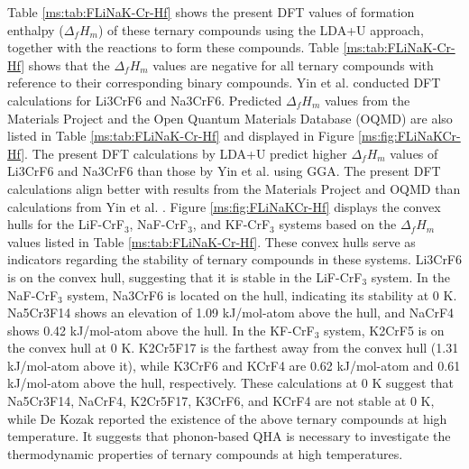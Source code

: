 Table \ref{ms:tab:FLiNaK-Cr-Hf} shows the present DFT values of formation enthalpy ($\Delta_fH_m$) of these ternary compounds using the LDA+U approach, together with the reactions to form these compounds. Table \ref{ms:tab:FLiNaK-Cr-Hf} shows that the $\Delta_fH_m$ values are negative for all ternary compounds with reference to their corresponding binary compounds. Yin et al. \cite{yin2018thermodynamic, yin2014thermodynamic} conducted DFT calculations for Li3CrF6 and Na3CrF6. Predicted $\Delta_fH_m$ values from the Materials Project \cite{jain2013commentary} and the Open Quantum Materials Database (OQMD) \cite{kirklin2015open} are also listed in Table \ref{ms:tab:FLiNaK-Cr-Hf} and displayed in Figure \ref{ms:fig:FLiNaKCr-Hf}. The present DFT calculations by LDA+U predict higher $\Delta_fH_m$ values of Li3CrF6 and Na3CrF6 than those by Yin et al. \cite{yin2018thermodynamic, yin2014thermodynamic} using GGA. The present DFT calculations align better with results from the Materials Project \cite{jain2013commentary} and OQMD \cite{kirklin2015open} than calculations from Yin et al. \cite{yin2018thermodynamic, yin2014thermodynamic}. Figure \ref{ms:fig:FLiNaKCr-Hf} displays the convex hulls for the LiF-CrF$_3$, NaF-CrF$_3$, and KF-CrF$_3$ systems based on the $\Delta_fH_m$ values listed in Table \ref{ms:tab:FLiNaK-Cr-Hf}. These convex hulls serve as indicators regarding the stability of ternary compounds in these systems. Li3CrF6 is on the convex hull, suggesting that it is stable in the LiF-CrF$_3$ system. In the NaF-CrF$_3$ system, Na3CrF6 is located on the hull, indicating its stability at 0 K. Na5Cr3F14 shows an elevation of 1.09 kJ/mol-atom above the hull, and NaCrF4 shows 0.42 kJ/mol-atom above the hull. In the KF-CrF$_3$ system, K2CrF5 is on the convex hull at 0 K. K2Cr5F17 is the farthest away from the convex hull (1.31 kJ/mol-atom above it), while K3CrF6 and KCrF4 are 0.62 kJ/mol-atom and 0.61 kJ/mol-atom above the hull, respectively. These calculations at 0 K suggest that Na5Cr3F14, NaCrF4, K2Cr5F17, K3CrF6, and KCrF4 are not stable at 0 K, while De Kozak \cite{DeKozak1969} reported the existence of the above ternary compounds at high temperature. It suggests that phonon-based QHA is necessary to investigate the thermodynamic properties of ternary compounds at high temperatures.

